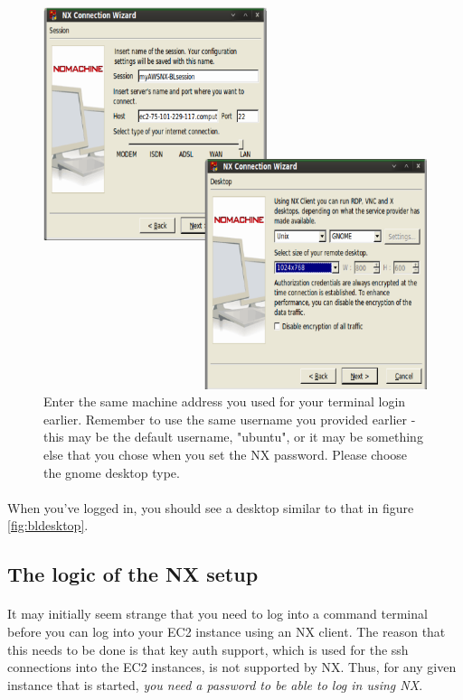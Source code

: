 \begin{figure}[!hd]
	\fbox
	{
		\begin{minipage}{13cm}
\includegraphics[width=\maxwidth]{"images/NXConnectionWizardandGnome"}
\caption[NX Client start]{\label{fig:NXConnectionWizard}Enter the same machine address you used for your terminal login earlier. Remember to use the same username you provided earlier - this may be the default username, "ubuntu", or it may be something else that you chose when you set the NX password. Please choose the gnome desktop type.}
		\end{minipage}
	}
\end{figure}

\paragraph{}When you've logged in, you should see a desktop similar to that in figure \ref{fig:bldesktop}.

\subsection{The logic of the NX setup}

\paragraph{}It may initially seem strange that you need to log into a command terminal before you can log into your EC2 instance using an NX client. The reason that this needs to be done is that key auth support, which is used for the ssh connections into the EC2 instances, is not supported by NX. Thus, for any given instance that is started, \emph{you need a password to be able to log in using NX}. 

